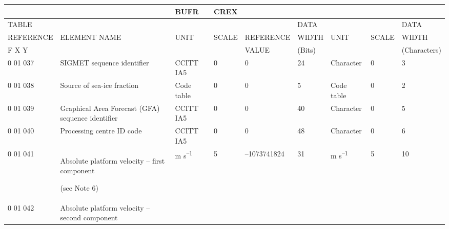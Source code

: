 \begin{longtable}[]{@{}lllllllll@{}}
\toprule
& & BUFR & CREX & & & & &\tabularnewline
\midrule
\endhead
TABLE & & & & & DATA & & & DATA\tabularnewline
REFERENCE & ELEMENT NAME & UNIT & SCALE & REFERENCE & WIDTH & UNIT & SCALE & WIDTH\tabularnewline
F X Y & & & & VALUE & (Bits) & & & (Characters)\tabularnewline
0 01 037 & SIGMET sequence identifier & CCITT IA5 & 0 & 0 & 24 & Character & 0 & 3\tabularnewline
0 01 038 & Source of sea-ice fraction & Code table & 0 & 0 & 5 & Code table & 0 & 2\tabularnewline
0 01 039 & Graphical Area Forecast (GFA) sequence identifier & CCITT IA5 & 0 & 0 & 40 & Character & 0 & 5\tabularnewline
0 01 040 & Processing centre ID code & CCITT IA5 & 0 & 0 & 48 & Character & 0 & 6\tabularnewline
\begin{minipage}[t]{0.08\columnwidth}\raggedright
0 01 041\strut
\end{minipage} & \begin{minipage}[t]{0.08\columnwidth}\raggedright
Absolute platform velocity -- first component

(see Note 6)\strut
\end{minipage} & \begin{minipage}[t]{0.08\columnwidth}\raggedright
m s\textsuperscript{--1}\strut
\end{minipage} & \begin{minipage}[t]{0.08\columnwidth}\raggedright
5\strut
\end{minipage} & \begin{minipage}[t]{0.08\columnwidth}\raggedright
--1073741824\strut
\end{minipage} & \begin{minipage}[t]{0.08\columnwidth}\raggedright
31\strut
\end{minipage} & \begin{minipage}[t]{0.08\columnwidth}\raggedright
m s\textsuperscript{--1}\strut
\end{minipage} & \begin{minipage}[t]{0.08\columnwidth}\raggedright
5\strut
\end{minipage} & \begin{minipage}[t]{0.08\columnwidth}\raggedright
10\strut
\end{minipage}\tabularnewline
\begin{minipage}[t]{0.08\columnwidth}\raggedright
0 01 042\strut
\end{minipage} & \begin{minipage}[t]{0.08\columnwidth}\raggedright
Absolute platform velocity -- second component


\end{minipage}
\end{longtable}
